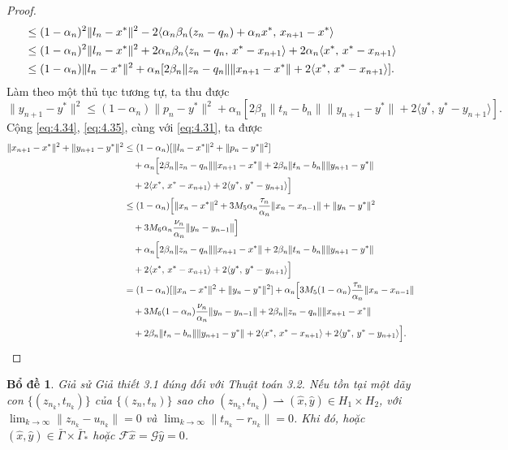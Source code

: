 \documentclass{MyBook}
\theoremstyle{plain}
\newtheorem{lemma}[theorem]{Bổ đề}
\theoremstyle{definition}
\theoremstyle{remark}
\numberwithin{equation}{chapter}
\newcommand{\Fc}{\mathcal{F}}
\newcommand{\Gc}{\mathcal{G}}
\newcommand{\inp}[2]{\langle #1,\,#2\rangle}
\newcommand{\nm}[1]{\lVert #1\rVert}
\newcommand{\wto}{\rightharpoonup}
\newcommand{\Gam}{\bar{\Gamma}}
\newcommand{\Gams}{\bar{\Gamma}_{*}}
\begin{document}
\begin{proof}
\begin{align}
&\le (1-\alpha_n)^2\nm{l_n-x^{*}}^2-2\inp{\alpha_n\beta_n(z_n-q_n)+\alpha_n x^{*}}{x_{n+1}-x^{*}}\notag\\
&\le (1-\alpha_n)^2\nm{l_n-x^{*}}^2+2\alpha_n\beta_n\inp{z_n-q_n}{x^{*}-x_{n+1}}+2\alpha_n\inp{x^{*}}{x^{*}-x_{n+1}}\notag\\
&\le (1-\alpha_n)\nm{l_n-x^{*}}^2+\alpha_n[2\beta_n\nm{z_n-q_n}\nm{x_{n+1}-x^{*}}+2\inp{x^{*}}{x^{*}-x_{n+1}}]. \label{eq:4.34}
\end{align}
Làm theo một thủ tục tương tự, ta thu được
\begin{equation}
\nm{y_{n+1}-y^{*}}^2\le(1-\alpha_n)\nm{p_n-y^{*}}^2+\alpha_n[2\beta_n\nm{t_n-b_n}\nm{y_{n+1}-y^{*}}+2\inp{y^{*}}{y^{*}-y_{n+1}}]. \label{eq:4.35}
\end{equation}
Cộng \eqref{eq:4.34}, \eqref{eq:4.35}, cùng với \eqref{eq:4.31}, ta được
\begin{align*}
\nm{x_{n+1}-x^{*}}^2+\nm{y_{n+1}-y^{*}}^2 &\le (1-\alpha_n)[\nm{l_n-x^{*}}^2+\nm{p_n-y^{*}}^2]\\
&\quad +\alpha_n\Bigl[2\beta_n\nm{z_n-q_n}\nm{x_{n+1}-x^{*}}+2\beta_n\nm{t_n-b_n}\nm{y_{n+1}-y^{*}}\\
&\quad +2\inp{x^{*}}{x^{*}-x_{n+1}}+2\inp{y^{*}}{y^{*}-y_{n+1}}\Bigr]\\
&\le (1-\alpha_n)\Bigl[\nm{x_n-x^{*}}^2+3M_5\alpha_n\frac{\tau_n}{\alpha_n}\nm{x_n-x_{n-1}}+\nm{y_n-y^{*}}^2\\
&\quad +3M_6\alpha_n\frac{\nu_n}{\alpha_n}\nm{y_n-y_{n-1}}\Bigr]\\
&\quad +\alpha_n\Bigl[2\beta_n\nm{z_n-q_n}\nm{x_{n+1}-x^{*}}+2\beta_n\nm{t_n-b_n}\nm{y_{n+1}-y^{*}}\\
&\quad +2\inp{x^{*}}{x^{*}-x_{n+1}}+2\inp{y^{*}}{y^{*}-y_{n+1}}\Bigr]\\
&= (1-\alpha_n)[\nm{x_n-x^{*}}^2+\nm{y_n-y^{*}}^2]+\alpha_n\Bigl[3M_5(1-\alpha_n)\frac{\tau_n}{\alpha_n}\nm{x_n-x_{n-1}}\\
&\quad +3M_6(1-\alpha_n)\frac{\nu_n}{\alpha_n}\nm{y_n-y_{n-1}}+2\beta_n\nm{z_n-q_n}\nm{x_{n+1}-x^{*}}\\
&\quad +2\beta_n\nm{t_n-b_n}\nm{y_{n+1}-y^{*}}+2\inp{x^{*}}{x^{*}-x_{n+1}}+2\inp{y^{*}}{y^{*}-y_{n+1}}\Bigr].
\end{align*}
\end{proof}

\begin{lemma}\label{lem:4.7}
Giả sử Giả thiết 3.1 đúng đối với Thuật toán 3.2. Nếu tồn tại một dãy con $\{(z_{n_k},t_{n_k})\}$ của $\{(z_n,t_n)\}$ sao cho $(z_{n_k},t_{n_k})\wto(\hat{x},\hat{y})\in H_1\times H_2$, với $\lim_{k\to\infty}\nm{z_{n_k}-u_{n_k}}=0$ và $\lim_{k\to\infty}\nm{t_{n_k}-r_{n_k}}=0$. Khi đó, hoặc $(\hat{x},\hat{y})\in\Gam\times\Gams$ hoặc $\Fc\hat{x}=\Gc\hat{y}=0$.
\end{lemma}
\end{document}
